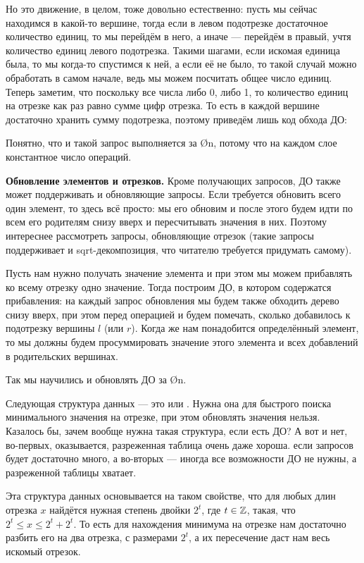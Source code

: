 {Но это движение, в целом, тоже довольно естественно: пусть мы сейчас находимся в какой-то вершине, тогда если в левом подотрезке достаточное количество единиц, то мы перейдём в него, а иначе — перейдём в правый, учтя количество единиц левого подотрезка. Такими шагами, если искомая единица была, то мы когда-то спустимся к ней, а если её не было, то такой случай можно обработать в самом начале, ведь мы можем посчитать общее число единиц.
Теперь заметим, что поскольку все числа либо 0, либо 1, то количество единиц на отрезке как раз равно сумме цифр отрезка. То есть в каждой вершине достаточно хранить сумму подотрезка, поэтому приведём лишь код обхода ДО:


Понятно, что и такой запрос выполняется за \O{\log n}, потому что на каждом слое константное число операций.

\textbf{Обновление элементов и отрезков.} Кроме получающих запросов, ДО также может поддерживать и обновляющие запросы. Если требуется обновить всего один элемент, то здесь всё просто: мы его обновим и после этого будем идти по всем его родителям снизу вверх и пересчитывать значения в них. Поэтому интереснее рассмотреть запросы, обновляющие отрезок (такие запросы поддерживает и sqrt-декомпозиция, что читателю требуется придумать самому).

Пусть нам нужно получать значение элемента и при этом мы можем прибавлять ко всему отрезку одно значение. Тогда построим ДО, в котором содержатся прибавления: на каждый запрос обновления мы будем также обходить дерево снизу вверх, при этом перед операцией  и  будем помечать, сколько добавилось к подотрезку вершины $l$ (или $r$). Когда же нам понадобится определённый элемент, то мы должны будем просуммировать значение этого элемента и всех добавлений в родительских вершинах. 

Так мы научились и обновлять ДО за \O{\log n}.


Следующая структура данных — это  или . Нужна она для быстрого поиска минимального значения на отрезке, при этом обновлять значения нельзя. Казалось бы, зачем вообще нужна такая структура, если есть ДО? А вот и нет, во-первых, оказывается, разреженная таблица очень даже хороша. если запросов будет достаточно много, а во-вторых — иногда все возможности ДО не нужны, а разреженной таблицы хватает.

Эта структура данных основывается на таком свойстве, что для любых длин отрезка $x$ найдётся нужная степень двойки $2^t$, где $t \in \mathbb{Z}$, такая, что $2^t \leq x \leq 2^t + 2^t$. То есть для нахождения минимума на отрезке нам достаточно разбить его на два отрезка, с размерами $2^t$, а их пересечение даст нам весь искомый отрезок.

}
